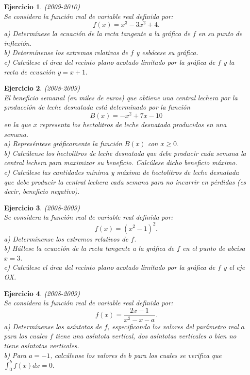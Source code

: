 \documentclass[12pt, a4paper]{amsart}
\newtheorem{ejer}{Ejercicio}
\begin{document}
\begin{ejer}\em (2009-2010)\\
Se considera la función real de variable real definida por:
$$
f(x)=x^3-3x^2+4.
$$
a) Determínese la ecuación de la recta tangente a la gráfica de $f$ en su punto de inflexión.\\
b) Determínense los extremos relativos de $f$ y esbócese su gráfica.\\
c) Calcúlese el área del recinto plano acotado limitado por la gráfica de $f$ y la recta de ecuación $y=x+1$.
\end{ejer}

\begin{ejer}\em (2008-2009)\\
El beneficio semanal (en miles de euros) que obtiene una central lechera por la producción de leche desnatada está determinado por la función
$$
B(x)=-x^2+7x-10
$$
en la que $x$ representa los hectolitros de leche desnatada producidos en una semana.\\
a) Represéntese gráficamente la función $B(x)$ con $x\geq 0$.\\
b) Calcúlense los hectolitros de leche desnatada que debe producir cada semana la central lechera para maximizar su beneficio. Calcúlese dicho beneficio máximo.\\
c) Calcúlese las cantidades mínima y máxima de hectolitros de leche desnatada que debe producir la central lechera cada semana para no incurrir en pérdidas (es decir, beneficio negativo).
\end{ejer}

\begin{ejer}\em (2008-2009)\\
Se considera la función real de variable real definida por:
$$
f(x)=(x^2-1)^2.
$$
a) Determínense los extremos relativos de $f$.\\
b) Hállese la ecuación de la recta tangente a la gráfica de $f$ en el punto de abcisa $x=3$.\\
c) Calcúlese el área del recinto plano acotado limitado por la gráfica de  $f$ y el eje OX.
\end{ejer}

\begin{ejer}\em (2008-2009)\\
Se considera la función real de variable real definida por:
$$
f(x)=\frac{2x-1}{x^2-x-a}.
$$
a) Determínense las asíntotas de $f$, especificando los valores del parámetro real $a$ para los cuales $f$ tiene una asíntota vertical, dos asíntotas verticales o bien no tiene asíntotas verticales.\\
b) Para $a=-1$, calcúlense los valores de $b$ para los cuales se verifica que $\int_0^b f(x)dx=0$.
\end{ejer}
\end{document}
